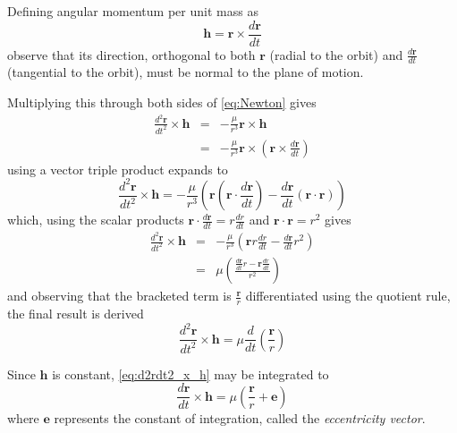 Defining angular momentum per unit mass as 
\begin{equation}
\mathbf{h}=\mathbf{r}\times\frac{d\mathbf{r}}{dt}\label{eq:angular_momentum}
\end{equation}
observe that its direction, orthogonal to both \(\mathbf{r}\) (radial to the orbit) and \(\frac{d\mathbf{r}}{dt}\) (tangential to the orbit), must be normal to the plane of motion.

Multiplying this through both sides of \eqref{eq:Newton} gives
\begin{eqnarray}
\frac{d^{2}\mathbf{r}}{dt^{2}}\times\mathbf{h} & = & -\frac{\mu}{r^{3}}\mathbf{r}\times\mathbf{h}\\
 & = & -\frac{\mu}{r^{3}}\mathbf{r}\times\left(\mathbf{r}\times\frac{d\mathbf{r}}{dt}\right)
\end{eqnarray}
using a vector triple product expands to
\begin{equation}
\frac{d^{2}\mathbf{r}}{dt^{2}}\times\mathbf{h}=-\frac{\mu}{r^{3}}\left(\mathbf{r}\left(\mathbf{r}\cdot\frac{d\mathbf{r}}{dt}\right)-\frac{d\mathbf{r}}{dt}\left(\mathbf{r}\cdot\mathbf{r}\right)\right)
\end{equation}
which, using the scalar products $\mathbf{r}\cdot\frac{d\mathbf{r}}{dt}=r\frac{dr}{dt}$ and 
$\mathbf{r}\cdot\mathbf{r}=r^{2}$ gives
\begin{eqnarray}
\frac{d^{2}\mathbf{r}}{dt^{2}}\times\mathbf{h} & = & -\frac{\mu}{r^{3}}\left(\mathbf{r}r\frac{dr}{dt}-\frac{d\mathbf{r}}{dt}r^{2}\right)\\
& = & \mu\left(\frac{\frac{d\mathbf{r}}{dt}r-\mathbf{r}\frac{dr}{dt}}{r^{2}}\right)
\end{eqnarray}
and observing that the bracketed term is $\frac{\mathbf{r}}{r}$ differentiated using the quotient rule, the final result is derived 
\begin{equation}
\frac{d^{2}\mathbf{r}}{dt^{2}}\times\mathbf{h}=\mu\frac{d}{dt}\left(\frac{\mathbf{r}}{r}\right)\label{eq:d2rdt2_x_h}
\end{equation}

Since $\mathbf{h}$ is constant, \eqref{eq:d2rdt2_x_h} may be integrated to
\begin{equation}
\frac{d\mathbf{r}}{dt}\times\mathbf{h}=\mu\left(\frac{\mathbf{r}}{r}+\mathbf{e}\right)
\end{equation}
where $\mathbf{e}$ represents the constant of integration, called the \emph{eccentricity vector}.

